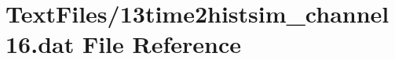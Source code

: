 \hypertarget{13time2histsim__channel16_8dat}{}\section{Text\+Files/13time2histsim\+\_\+channel16.dat File Reference}
\label{13time2histsim__channel16_8dat}

